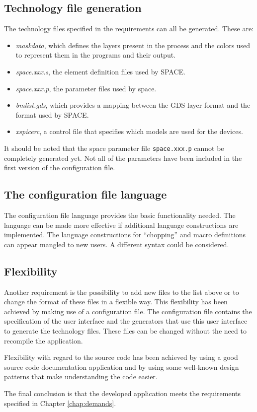 \subsection*{Technology file generation}
The technology files specified in the requirements can all be generated. These
are:
\begin{itemize}
\item \emph{maskdata}, which defines the layers present in the process and the
colors used to represent them in the programs and their output.
\item \emph{space.xxx.s}, the element definition files used by SPACE.
\item \emph{space.xxx.p}, the parameter files used by space.
\item \emph{bmlist.gds}, which provides a mapping between the GDS layer format and
the format used by SPACE.
\item \emph{xspicerc}, a control file that specifies which models are used for
the devices.
\end{itemize}
It should be noted that the space parameter file \verb=space.xxx.p= cannot be
completely generated yet. Not all of the parameters have been included in the
first version of the configuration file.

\subsection*{The configuration file language}
The configuration file language provides the basic functionality needed. The
language can be made more effective if additional language constructions are
implemented. The language constructions for ``chopping'' and macro definitions
can appear mangled to new users. A different syntax could be considered.

\subsection*{Flexibility}
Another requirement is the possibility to add new files to the list above or to
change the format of these files in a flexible way. This flexibility has been
achieved by making use of a configuration file. The configuration file contains
the specification of the user interface and the generators that use this user
interface to generate the technology files. These files can be changed without
the need to recompile the application.

Flexibility with regard to the source code has been achieved by using a good
source code documentation application and by using some well-known design
patterns that make understanding the code easier.

\bigskip \noindent
The final conclusion is that the developed application meets the requirements
specified in Chapter \ref{chap:demands}.
